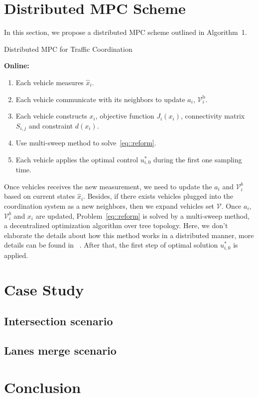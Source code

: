 \documentclass[letterpaper, 10 pt, conference]{ieeeconf}
\begin{document}
\section{Distributed MPC Scheme}
\label{sec::mpc}
In this section, we propose a distributed MPC scheme outlined in Algorithm~1.
\begin{algorithm}[H]
	\caption{Distributed MPC for Traffic Coordination}	\textbf{Online:}
	\begin{enumerate}
		
		\item \label{MPCstep1} Each vehicle measures $\hat{x}_i$.
		
		\item \label{MPCstep2} Each vehicle communicate with its neighbors to update $a_i$, $\mathcal{V}_i^\mathrm{b}$.

		\item \label{MPCstep3} Each vehicle constructs $x_i$, objective function $J_i(x_i)$, connectivity matrix $S_{i,j}$ and constraint $d(x_i)$.

		\item \label{MPCstep4} Use multi-sweep method to solve~\eqref{eq::reform}.
		
		\item \label{MPCstep5} Each vehicle applies the optimal control $u^*_{i,0}$ during the first one sampling time.	
		
		
	\end{enumerate}
	\label{alg::ALADIN}
\end{algorithm}
Once vehicles receives the new measurement, we need to update the $a_i$ and $\mathcal{V}_i^b$ based on current states $\hat{x}_i$. Besides, if there exists vehicles plugged into the coordination system as a new neighbors, then we expand vehicles set $\mathcal{V}$.
Once $a_i$, $\mathcal{V}_i^b$ and $x_i$ are updated, Problem~\eqref{eq::reform} is solved by a multi-sweep method, a decentralized optimization algorithm over tree topology. Here, we don't elaborate the details about how this method works in a distributed manner, more details can be found in ~\cite{JiangTree}. After that, the first step of optimal solution $u^*_{i,0}$ is applied.

\section{Case Study}
\label{sec::case}
\subsection{Intersection scenario}


\subsection{Lanes merge scenario}


\section{Conclusion}
\label{sec::conc}




\end{document}
